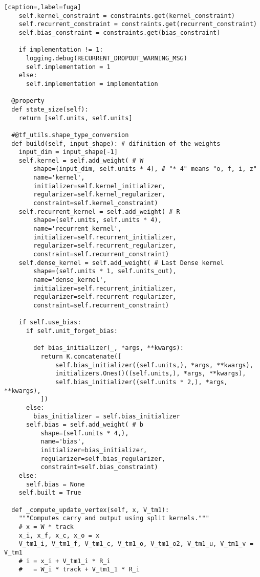 \begin{lstlisting}[caption=,label=fuga]
    self.kernel_constraint = constraints.get(kernel_constraint)
    self.recurrent_constraint = constraints.get(recurrent_constraint)
    self.bias_constraint = constraints.get(bias_constraint)

    if implementation != 1:
      logging.debug(RECURRENT_DROPOUT_WARNING_MSG)
      self.implementation = 1
    else:
      self.implementation = implementation

  @property
  def state_size(self):
    return [self.units, self.units]

  #@tf_utils.shape_type_conversion
  def build(self, input_shape): # difinition of the weights
    input_dim = input_shape[-1]
    self.kernel = self.add_weight( # W
        shape=(input_dim, self.units * 4), # "* 4" means "o, f, i, z"
        name='kernel',
        initializer=self.kernel_initializer,
        regularizer=self.kernel_regularizer,
        constraint=self.kernel_constraint)
    self.recurrent_kernel = self.add_weight( # R
        shape=(self.units, self.units * 4),
        name='recurrent_kernel',
        initializer=self.recurrent_initializer,
        regularizer=self.recurrent_regularizer,
        constraint=self.recurrent_constraint)
    self.dense_kernel = self.add_weight( # Last Dense kernel
        shape=(self.units * 1, self.units_out),
        name='dense_kernel',
        initializer=self.recurrent_initializer,
        regularizer=self.recurrent_regularizer,
        constraint=self.recurrent_constraint)

    if self.use_bias:
      if self.unit_forget_bias:

        def bias_initializer(_, *args, **kwargs):
          return K.concatenate([
              self.bias_initializer((self.units,), *args, **kwargs),
              initializers.Ones()((self.units,), *args, **kwargs),
              self.bias_initializer((self.units * 2,), *args, **kwargs),
          ])
      else:
        bias_initializer = self.bias_initializer
      self.bias = self.add_weight( # b
          shape=(self.units * 4,),
          name='bias',
          initializer=bias_initializer,
          regularizer=self.bias_regularizer,
          constraint=self.bias_constraint)
    else:
      self.bias = None
    self.built = True

  def _compute_update_vertex(self, x, V_tm1):
    """Computes carry and output using split kernels."""
    # x = W * track
    x_i, x_f, x_c, x_o = x
    V_tm1_i, V_tm1_f, V_tm1_c, V_tm1_o, V_tm1_o2, V_tm1_u, V_tm1_v = V_tm1
    # i = x_i + V_tm1_i * R_i
    #   = W_i * track + V_tm1_1 * R_i


\end{lstlisting}
